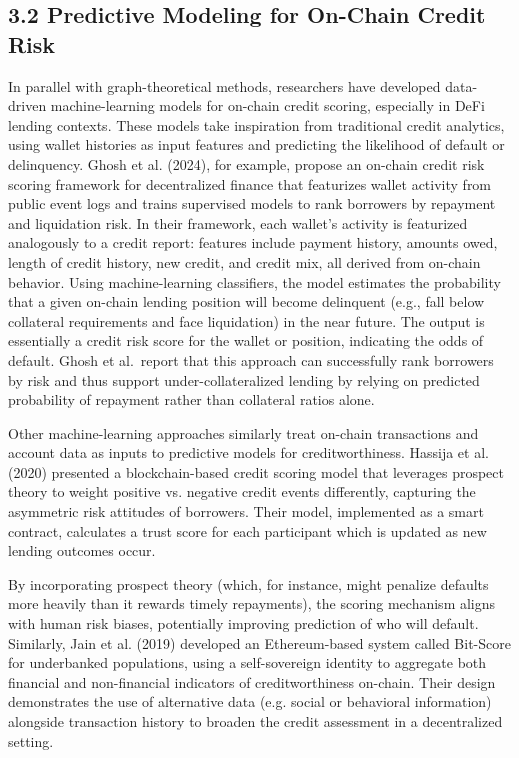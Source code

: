 \subsection*{3.2 Predictive Modeling for On-Chain Credit Risk}
\label{sec:predictive-modeling-for-on-chain-credit-risk}

In parallel with graph-theoretical methods, researchers have developed data-driven machine-learning models for on-chain credit scoring, especially in DeFi lending contexts. These models take inspiration from traditional credit analytics, using wallet histories as input features and predicting the likelihood of default or delinquency. Ghosh et al. (2024), for example, propose an on-chain credit risk scoring framework for decentralized finance that featurizes wallet activity from public event logs and trains supervised models to rank borrowers by repayment and liquidation risk. In their framework, each wallet's activity is featurized analogously to a credit report: features include payment history, amounts owed, length of credit history, new credit, and credit mix, all derived from on-chain behavior. Using machine-learning classifiers, the model estimates the probability that a given on-chain lending position will become delinquent (e.g., fall below collateral requirements and face liquidation) in the near future. The output is essentially a credit risk score for the wallet or position, indicating the odds of default. Ghosh et al.\ report that this approach can successfully rank borrowers by risk and thus support under-collateralized lending by relying on predicted probability of repayment rather than collateral ratios alone.


Other machine-learning approaches similarly treat on-chain transactions and account data as inputs to predictive models for creditworthiness. Hassija et al. (2020) presented a blockchain-based credit scoring model that leverages prospect theory to weight positive vs. negative credit events differently, capturing the asymmetric risk attitudes of borrowers. Their model, implemented as a smart contract, calculates a trust score for each participant which is updated as new lending outcomes occur.


By incorporating prospect theory (which, for instance, might penalize defaults more heavily than it rewards timely repayments), the scoring mechanism aligns with human risk biases, potentially improving prediction of who will default. Similarly, Jain et al. (2019) developed an Ethereum-based system called Bit-Score for underbanked populations, using a self-sovereign identity to aggregate both financial and non-financial indicators of creditworthiness on-chain. Their design demonstrates the use of alternative data (e.g. social or behavioral information) alongside transaction history to broaden the credit assessment in a decentralized setting.


